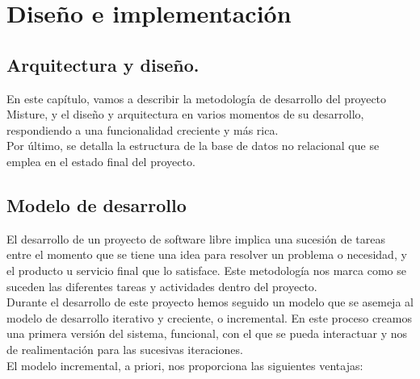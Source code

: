 \cleardoublepage
\chapter{Diseño e implementación}
\label{chap:design_implement}


\section{Arquitectura y diseño.}

En este capítulo, vamos a describir la metodología de desarrollo del proyecto Misture, y el diseño y arquitectura en varios momentos de su desarrollo, respondiendo a una funcionalidad creciente y más rica.\\


Por último, se detalla la estructura de la base de datos no relacional que se emplea en el estado final del proyecto.\\


\section{Modelo de desarrollo} 
\label{subsec:modelo_desarrollo}

El desarrollo de un proyecto de software libre implica una sucesión de tareas entre el momento que se tiene una idea para resolver un problema o necesidad, y el producto u servicio final que lo satisface. Este metodología nos marca como se suceden las diferentes tareas y actividades dentro del proyecto.\\


Durante el desarrollo de este proyecto hemos seguido un modelo que se asemeja al modelo de desarrollo iterativo y creciente, o incremental.  En este proceso creamos una primera versión del sistema, funcional, con el que se pueda interactuar y nos de realimentación para las sucesivas iteraciones.\\


El modelo incremental, a priori, nos proporciona las siguientes ventajas:\\

